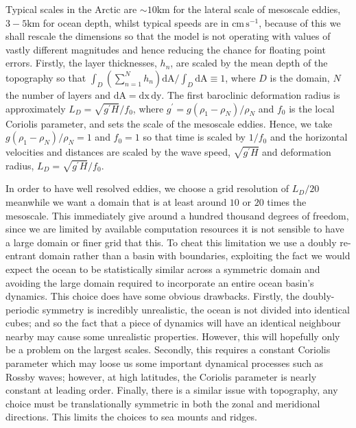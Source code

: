 \documentclass[12pt,a4paper]{report}
\begin{document}
  Typical scales in the Arctic are $\sim 10 \mathrm{km}$ for
  the lateral scale of mesoscale eddies,
  $3-5 \mathrm{km}$ for ocean depth, whilst typical speeds are in
  $\mathrm{cm}\,\mathrm{s}^{-1}$, because of this we shall rescale the 
  dimensions so that the model is not operating with values of vastly different magnitudes
  and hence reducing the chance for floating point errors. Firstly, the layer thicknesses,
  $h_{n}$, are scaled by the mean depth of the topography so that 
  $ \int_{D} \left(\sum_{n=1}^{N} h_{n}\right)  \mathrm{ d A} / \int_{D} \mathrm{ d A} \equiv 1 $, 
  where $D$  is the domain, $N$ the number of layers and
  $ \mathrm{ d A} = \mathrm{ d x}\, \mathrm{ d y}$. 
  The first baroclinic deformation radius is approximately $L_{D}=\sqrt{g^{\prime}H}/f_{0}$,
  where ${g^{\prime}=g\left(\rho_{1}-\rho_{N}\right)}/\rho_{N}$ and $f_{0}$ is 
  the local Coriolis parameter, and sets the scale of the mesoscale eddies.
  Hence, we take ${g\left(\rho_{1}-\rho_{N}\right)}/\rho_{N} = 1 $
  and $f_{0}=1$ so that time is scaled by $1/f_{0}$ and the horizontal velocities and distances are scaled by the wave speed, $\sqrt{g^{\prime}H}$ and deformation radius, $L_{D}=\sqrt{g^{\prime}H}/f_{0}$.

  In order to have well resolved eddies, we choose a grid resolution of $ L_{D} / 20$
  meanwhile we want a domain that is at least around $10$ or $20$ times the 
  mesoscale. This immediately give around a hundred thousand degrees of freedom,
  since we are limited by available computation resources it is not sensible
  to have a large domain or finer grid that this. To cheat this limitation
  we use a doubly re-entrant domain rather than a basin with boundaries, exploiting
  the fact we would expect the ocean to be statistically similar across a symmetric 
  domain and avoiding the large domain required to incorporate an entire ocean basin's
  dynamics. This choice does have some obvious drawbacks. Firstly, the doubly-periodic symmetry is
  incredibly unrealistic, the ocean is not divided into identical cubes; and so the 
  fact that a piece of dynamics will have an identical neighbour nearby may cause some
  unrealistic properties. However, this will hopefully only be a problem on the largest 
  scales. Secondly, this requires a constant Coriolis parameter which may loose
  us some important dynamical processes such as Rossby waves; however, at high latitudes, the Coriolis parameter is nearly constant
  at leading order.
  Finally, there is a similar issue with topography, any choice must be
  translationally symmetric in both the zonal and meridional directions. This limits the choices to sea mounts and ridges.  
    
\end{document}
